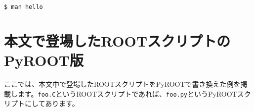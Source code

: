 \begin{lstlisting}[language=bash]
$ man hello
\end{lstlisting}

\chapter{本文で登場したROOTスクリプトのPyROOT版}
ここでは、本文中で登場したROOTスクリプトをPyROOTで書き換えた例を掲載します。\texttt{foo.C}というROOTスクリプトであれば、\texttt{foo.py}というPyROOTスクリプトにしてあります。

\begin{NoFloat}

\end{NoFloat}
